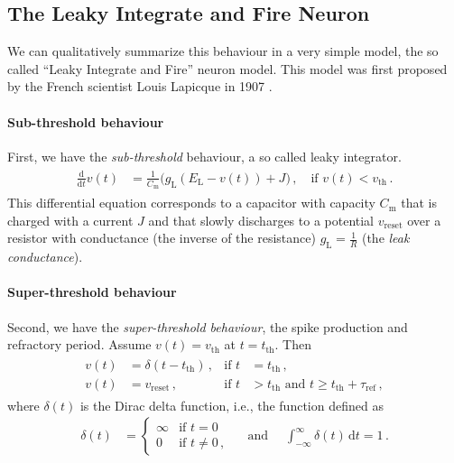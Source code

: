 \documentclass[10pt,letterpaper,oneside]{article}
\begin{document}
\subsection{The Leaky Integrate and Fire Neuron}

We can qualitatively summarize this behaviour in a very simple model, the so called \enquote{Leaky Integrate and Fire} neuron model. This model was first proposed by the French scientist Louis Lapicque in 1907 \cite{lapicque1907recherches,abbott1999lapicque}.

\paragraph{Sub-threshold behaviour}
First, we have the \emph{sub-threshold} behaviour, a so called leaky integrator.
\begin{align}
	\begin{aligned}
		\frac{\mathrm{d}}{\mathrm{d}t} v(t) &= \frac{1}{C_\mathrm{m}} \big(g_\mathrm{L} (E_\mathrm{L} - v(t))
			+ J
		\big) \,, \quad \text{if } v(t) < v_\mathrm{th}\,.
	\end{aligned}
	\label{eqn:sub-threshold}
\end{align}
This differential equation corresponds to a capacitor with capacity $C_\mathrm{m}$ that is charged with a current $J$ and that slowly discharges to a potential $v_\mathrm{reset}$ over a resistor with conductance (the inverse of the resistance) $g_\mathrm{L} = \frac{1}{R}$ (the \emph{leak conductance}).

\paragraph{Super-threshold behaviour}
Second, we have the \emph{super-threshold behaviour}, the spike production and refractory period. Assume $v(t) = v_\mathrm{th}$ at $t = t_\mathrm{th}$. Then
\begin{align}
	\begin{aligned}
		v(t) &= \delta(t - t_\mathrm{th}) \,, &\text{if } t &= t_\mathrm{th} \,,\\
		v(t) &= v_\mathrm{reset} \,, &\text{if } t &> t_\mathrm{th} \text{ and } t \geq t_\mathrm{th} + \tau_\mathrm{ref} \,,
	\end{aligned}
	\label{eqn:super-threshold}
\end{align}
where $\delta(t)$ is the Dirac delta function, i.e., the function defined as
\begin{align*}
	\delta(t) &= \begin{cases} \infty & \text{if } t = 0 \, \\ 0 & \text{if } t \neq 0 \,, \end{cases}  \quad \text{ and } \quad \int_{-\infty}^\infty \delta(t)\,\mathrm{d}t = 1 \,.
\end{align*}
\end{document}

